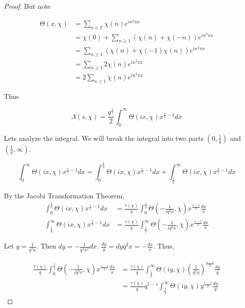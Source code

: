 \documentclass{article}
\newcommand{\Z}{\mathbb{Z}}
\begin{document}
\begin{proof}
    But note 

    \begin{align*}
        \Theta(x, \chi) &= \sum_{n \in \Z} \chi(n) e^{in^2 \pi x}\\ 
        &= \chi(0) + \sum_{n \geq 1} (\chi(n) + \chi(-n)) e^{i n^2 \pi x} \\
        &= \sum_{n \geq 1} (\chi(n) + \chi(-1)\chi(n)) e^{i n^2 \pi x} \\
        &= \sum_{n \geq 1} 2 \chi(n) e^{i n^2 \pi x} \\
        &= 2 \sum_{n \geq 1} \chi(n) e^{i n^2 \pi x}
    \end{align*}


    Thus 

    \[\Lambda(s, \chi) = \frac{q^{\frac{s}{2}}}{2} \int_{0}^{\infty} \Theta(ix, \chi) x^{\frac{s}{2} - 1} dx\]
    
    Lets analyze the integral. We will break the integral into two parts $(0, \frac{1}{q})$ and $(\frac{1}{q}, \infty)$.  

    \[\int_{0}^{\infty} \Theta(ix, \chi) x^{\frac{s}{2} - 1} dx = \int_{0}^{\frac{1}{q}} \Theta(ix, \chi) x^{\frac{s}{2} - 1} dx + \int_{\frac{1}{q}}^{\infty} \Theta(ix, \chi) x^{\frac{s}{2} - 1} dx \]

    By the Jacobi Transformation Theorem, 
    \begin{align*}
        \int_{0}^{\frac{1}{q}} \Theta(ix, \chi) x^{\frac{s}{2} - 1} dx &= \frac{\tau(\chi)}{q}\int_{0}^{\frac{1}{q}} \Theta\left(-\frac{1}{iq^2x}, \overline{\chi}\right)x^{\frac{s - 1}{2}} \frac{dx}{x} \\
        \int_{\frac{1}{q}}^{\infty} \Theta(ix, \chi) x^{\frac{s}{2} - 1} dx &= \frac{\tau(\chi)}{q}\int_{\frac{1}{q}}^{\infty} \Theta\left(-\frac{1}{iq^2x}, \overline{\chi}\right)x^{\frac{s - 1}{2}} \frac{dx}{x}
    \end{align*}

    Let $y = \frac{1}{q^2 x}$. Then $dy = - \frac{1}{q^2 x^2} dx$. $\frac{dy}{y} = dy q^2 x = -\frac{dx}{x}$. Thus, 

    \begin{align*}
        \frac{\tau(\chi)}{q}\int_{0}^{\frac{1}{q}} \Theta\left(-\frac{1}{iq^2x}, \overline{\chi}\right)x^{\frac{s - 1}{2}} \frac{dx}{x} &= \frac{\tau(\chi)}{q}\int_{\frac{1}{q}}^{\infty} \Theta\left(iy, \overline{\chi}\right)\left(\frac{1}{q^2 y}\right)^{\frac{s - 1}{2}} \frac{dy}{y} \\
        &= \frac{\tau(\chi)}{q} q^{1 - s} \int_{\frac{1}{q}}^{\infty} \Theta\left(iy, \overline{\chi}\right)y^{\frac{1 - s}{2}} \frac{dy}{y}
    \end{align*}


\end{proof}
\end{document}
